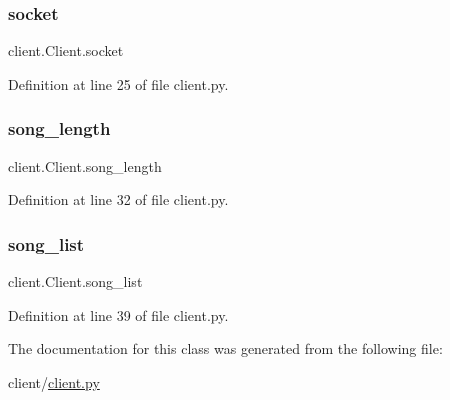 \subsubsection{\texorpdfstring{socket}{socket}}
{\footnotesize\ttfamily client.\+Client.\+socket}



Definition at line 25 of file client.\+py.

\mbox{\label{classclient_1_1_client_a3dfc5ac11c107b242739a343e1cee50a}} 
\subsubsection{\texorpdfstring{song\_length}{song\_length}}
{\footnotesize\ttfamily client.\+Client.\+song\+\_\+length}



Definition at line 32 of file client.\+py.

\mbox{\label{classclient_1_1_client_a7be73ebcc2918382399a9d3caa253ab7}} 
\subsubsection{\texorpdfstring{song\_list}{song\_list}}
{\footnotesize\ttfamily client.\+Client.\+song\+\_\+list}



Definition at line 39 of file client.\+py.



The documentation for this class was generated from the following file\+:\begin{DoxyCompactItemize}
\item 
client/\mbox{\hyperlink{client_8py}{client.\+py}}\end{DoxyCompactItemize}
